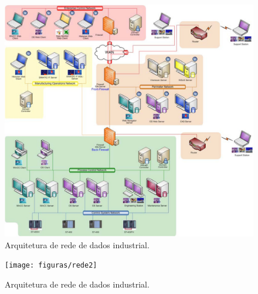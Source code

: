 \begin{figure}[hbt]
	\begin{center}
		\includegraphics[width=\textwidth]{figuras/rede}
	\end{center}
	\caption{Arquitetura de rede de dados industrial.}
	\label{fig:rede}
\end{figure}

\begin{figure}[hbt]
	\begin{center}
		\texttt{[image: figuras/rede2]}
	\end{center}
	\caption{Arquitetura de rede de dados industrial.}
	\label{fig:rede2}
\end{figure}